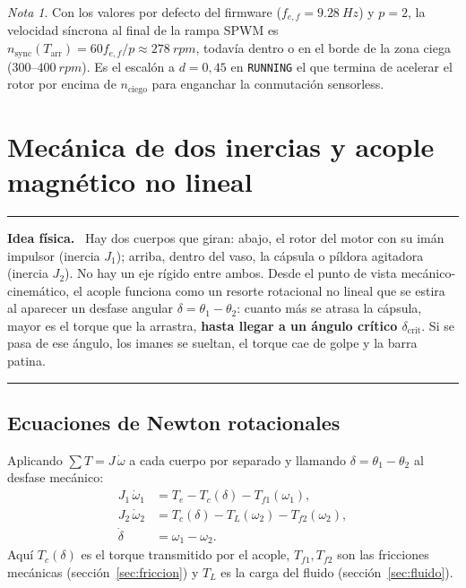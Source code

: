 \documentclass[11pt,a4paper,oneside]{report}
\theoremstyle{definition}
\theoremstyle{remark}
\newtheorem{nota}{Nota}[chapter]
\newenvironment{idea}%
  {\par\medskip\noindent\begin{minipage}{\linewidth}\hrule\smallskip
   \noindent\textbf{Idea física.}\ }%
  {\smallskip\hrule\end{minipage}\par\medskip}
\begin{document}
\begin{nota}
Con los valores por defecto del firmware ($f_{e,f}=\SI{9,28}{Hz}$) y $p=2$, la
velocidad síncrona al final de la rampa SPWM es
$n_{\text{sync}}(T_{\text{arr}}) = 60 f_{e,f}/p \approx \SI{278}{rpm}$, todavía
dentro o en el borde de la zona ciega ($300\text{--}\SI{400}{rpm}$). Es el
escalón a $d=0{,}45$ en \texttt{RUNNING} el que termina de acelerar el rotor
por encima de $n_{\text{ciego}}$ para enganchar la conmutación sensorless.
\end{nota}

\chapter{Mecánica de dos inercias y acople magnético no lineal}\label{cap:mecanica}

\begin{idea}
Hay dos cuerpos que giran: abajo, el rotor del motor con su imán impulsor
(inercia $J_1$); arriba, dentro del vaso, la cápsula o píldora agitadora
(inercia $J_2$). No hay un eje rígido entre ambos. Desde el punto de vista
mecánico-cinemático, el acople funciona como un resorte rotacional no lineal
que se estira al aparecer un desfase angular $\delta = \theta_1 - \theta_2$:
cuanto más se atrasa la cápsula, mayor es el torque que la arrastra,
\textbf{hasta llegar a un ángulo crítico $\delta_{\text{crit}}$}. Si se pasa de
ese ángulo, los imanes se sueltan, el torque cae de golpe y la barra patina.
\end{idea}

\section{Ecuaciones de Newton rotacionales}
Aplicando $\sum T = J\,\dot\omega$ a cada cuerpo por separado y llamando
$\delta = \theta_1 - \theta_2$ al desfase mecánico:
\begin{align}
  J_1\,\dot\omega_1 &= T_e - T_c(\delta) - T_{f1}(\omega_1), \label{eq:j1}\\
  J_2\,\dot\omega_2 &= T_c(\delta) - T_L(\omega_2) - T_{f2}(\omega_2), \label{eq:j2}\\
  \dot\delta &= \omega_1 - \omega_2 . \label{eq:delta}
\end{align}
Aquí $T_c(\delta)$ es el torque transmitido por el acople, $T_{f1}, T_{f2}$ son
las fricciones mecánicas (sección~\ref{sec:friccion}) y $T_L$ es la carga del
fluido (sección~\ref{sec:fluido}).
\end{document}
